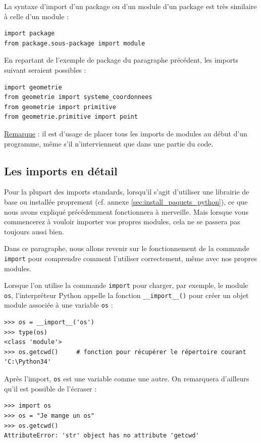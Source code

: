 \documentclass[12pt, a4paper]{article}
\begin{document}
La syntaxe d'import d'un package ou d'un module d'un package est très similaire à celle d'un module :
\begin{lstlisting}
import package
from package.sous-package import module
\end{lstlisting}

En repartant de l'exemple de package du paragraphe précédent, les imports suivant seraient possibles :
\begin{lstlisting}
import geometrie
from geometrie import systeme_coordonnees
from geometrie import primitive
from geometrie.primitive import point
\end{lstlisting}

\underline{Remarque} : il est d'usage de placer tous les imports de modules au début d'un programme, même s'il n'interviennent que dans une partie du code.


\subsection{Les imports en détail}
Pour la plupart des imports standards, lorsqu'il s'agit d'utiliser une librairie de base ou installée proprement (cf. annexe \ref{sec:install_paquets_python}), ce que nous avons expliqué précédemment fonctionnera à merveille. Mais lorsque vous commencerez à vouloir importer vos propres modules, cela ne se passera pas toujours aussi bien.

Dans ce paragraphe, nous allons revenir sur le fonctionnement de la commande \lstinline{import} pour comprendre comment l'utiliser correctement, même avec nos propres modules.

Lorsque l'on utilise la commande \lstinline{import} pour charger, par exemple, le module \lstinline{os}, l'interpréteur Python appelle la fonction \lstinline{__import__()} pour créer un objet module associée à une variable \lstinline{os} :
\begin{lstlisting}
>>> os = __import__('os')
>>> type(os)
<class 'module'>
>>> os.getcwd()		# fonction pour récupérer le répertoire courant
'C:\Python34'
\end{lstlisting} 

Après l'import, \lstinline{os} est une variable comme une autre. On remarquera d'ailleurs qu'il est possible de l'écraser :
\begin{lstlisting}
>>> import os
>>> os = "Je mange un os"
>>> os.getcwd()
AttributeError: 'str' object has no attribute 'getcwd'
\end{lstlisting} 
\end{document}
